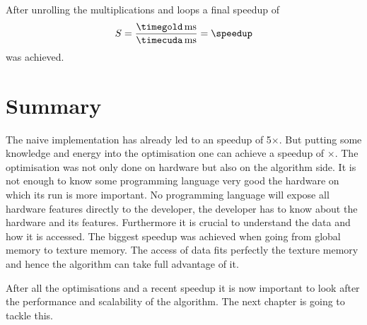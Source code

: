 After unrolling the multiplications and loops a final speedup of 
\fpDiv{\speedup}{\timegold}{\timecuda}
\begin{equation*}\label{eq:speedup11}
	S = \frac{\unit[\timegold]{ms}}{\unit[\timecuda]{ms}} = \speedup
\end{equation*}
was achieved.

\section{Summary} %
\label{sec:optimization_summary}
The naive implementation has already led to an speedup of 5$\times$. But putting
some knowledge and energy into the optimisation one can achieve a speedup of 
\speedup$\times$. The optimisation was not only done on hardware but also on the 
algorithm side. It is not enough to know some programming language very good the
hardware on which its run is more important. No programming language will expose
all hardware features directly to the developer, the developer has to know
about the hardware and its features. Furthermore it is crucial to understand
the data and how it is accessed. The biggest speedup was achieved when
going from global memory to texture memory. The access of data fits perfectly
the texture memory and hence the algorithm can take full advantage of it. 

After all the optimisations and a recent speedup it is now important to look 
after the performance and scalability of the algorithm. The next chapter is 
going to tackle this. 




